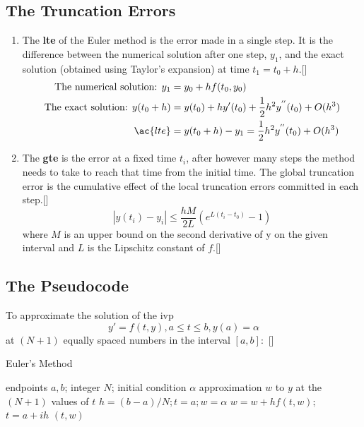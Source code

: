 \documentclass[12pt,oneside]{book}
\begin{document}
\begin{spacing}{1.2}
			\subsection{The Truncation Errors}
				\begin{enumerate}
					\item The \textbf{\ac{lte}} of the Euler method is the error made in a single step. It is the difference between the numerical solution after one step, $y_{1}$, and the exact solution (obtained using Taylor's expansion) at time $t_{1} = t_{0} + h$.[]
					\begin{equation*}
						\begin{split}
							\text{The numerical solution: } y_{1} & = y_{0} + hf(t_{0}, y_{0}) \\
							\text{The exact solution: } y(t_{0} + h) & = y(t_{0}) + hy'(t_{0}) + \frac{1}{2}h^2y^{''}(t_{0}) + O(h^{3}) \\
							\ac{lte} & = y(t_{0} + h) - y_{1} = \frac{1}{2}h^2y^{''}(t_{0}) + O(h^{3})
						\end{split}
					\end{equation*}
					
					\item The \textbf{\ac{gte}} is the error at a fixed time $t_{i}$, after however many steps the method needs to take to reach that time from the initial time. The global truncation error is the cumulative effect of the local truncation errors committed in each step.[]
					\begin{equation*}
						|y(t_{i}) - y_{i}| \leq \frac{hM}{2L} (e^{L(t_{i} - t_{0})} - 1)
					\end{equation*}
					where $ M $ is an upper bound on the second derivative of y on the given interval and $ L $ is the Lipschitz constant of $ f $.[]
				\end{enumerate}
			
			\subsection{The Pseudocode}
				To approximate the solution of the \ac{ivp}
				\[ y' = f(t,y), a \leq t \leq b, y(a) = \alpha \]
				at $ (N+1) $ equally spaced numbers in the interval $ [a, b]: $ []
				
				\begin{algorithm}
					\caption{Euler's Method}
					\begin{algorithmic}[1]
						\REQUIRE endpoints $ a, b $; integer $ N $; initial condition $ \alpha $
						\ENSURE approximation $ w $ to $ y $ at the $ (N + 1) $ values of $ t $
						\STATE $ h = (b - a) / N; t = a; w = \alpha $
							\STATE $ w = w + hf(t,w); $ 
							\STATE $ t = a + ih $ 
							\RETURN $ (t, w) $
						\ENDFOR
					\end{algorithmic}
				\end{algorithm}
			
		\end{spacing}
\end{document}
